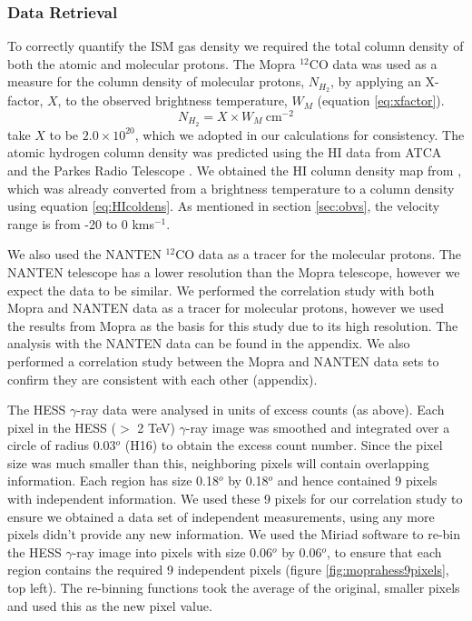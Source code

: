 \documentclass[12pt,a4paper]{article}
\begin{document}
\subsubsection{Data Retrieval}
To correctly quantify the ISM gas density we required the total column density of both the atomic and molecular protons. The Mopra $^{12}$CO data was used as a measure for the column density of molecular protons, $N_{H_2}$, by applying an X-factor, $X$, to the observed brightness temperature, $W_M$ (equation \ref{eq:xfactor}). 
\begin{equation}
\label{eq:xfactor}
N_{H_2} = X \times W_M \ \mathrm{ cm}^{-2}
\end{equation} 
\cite{2012ApJ...746...82F} take $X$ to be $2.0 \times 10^{20}$, which we adopted in our calculations for consistency. The atomic hydrogen column density was predicted using the HI data from ATCA and the Parkes Radio Telescope \citep{2005ApJS..158..178M}. We obtained the HI column density map from \cite{2012ApJ...746...82F}, which was already converted from a brightness temperature to a column density using equation \ref{eq:HIcoldens}. As mentioned in section \ref{sec:obvs}, the velocity range is from -20 to 0 kms$^{-1}$. 

We also used the NANTEN $^{12}$CO data as a tracer for the molecular protons. The NANTEN telescope has a lower resolution than the Mopra telescope, however we expect the data to be similar. We performed the correlation study with both Mopra and NANTEN data as a tracer for molecular protons, however we used the results from Mopra as the basis for this study due to its high resolution. The analysis with the NANTEN data can be found in the appendix. We also performed a correlation study between the Mopra and NANTEN data sets to confirm they are consistent with each other (appendix).

The HESS $\gamma$-ray data were analysed in units of excess counts (as above). Each pixel in the HESS ($>$ 2 TeV) $\gamma$-ray image was smoothed and integrated over a circle of radius 0.03$^o$ (H16) to obtain the excess count number. Since the pixel size was much smaller than this, neighboring pixels will contain overlapping information. Each region has size 0.18$^o$ by 0.18$^o$ and hence contained 9 pixels with independent information. We used these 9 pixels for our correlation study to ensure we obtained a data set of independent measurements, using any more pixels didn't provide any new information. We used the Miriad software \citep{1995ASPC...77..433S} to re-bin the HESS $\gamma$-ray image into pixels with size 0.06$^o$ by 0.06$^o$, to ensure that each region contains the required 9 independent pixels (figure \ref{fig:moprahess9pixels}, top left). The re-binning functions took the average of the original, smaller pixels and used this as the new pixel value. 
\end{document}
